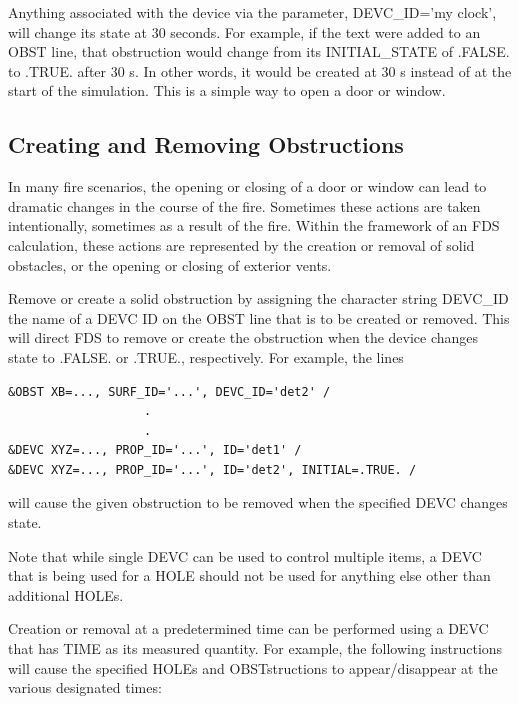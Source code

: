\documentclass[11pt]{book}
\begin{document}
\noindent
Anything associated with the device via the parameter, {\ct DEVC\_ID='my clock'}, will change its state at 30 seconds. For example,
if the text were added to an {\ct OBST} line, that obstruction would change from its {\ct INITIAL\_STATE} of {\ct .FALSE.} to {\ct .TRUE.} after
30 s. In other words, it would be created at 30 s instead of at the start of the simulation. This is a simple way to open a door or window.


\subsection{Creating and Removing Obstructions}
\label{info:create_remove}

In many fire scenarios, the opening or closing of a door or window
can lead to dramatic changes in the course of the fire. Sometimes these
actions are taken intentionally, sometimes as a result of the fire.
Within the framework of an FDS calculation, these actions are
represented by the creation or removal of solid obstacles, or the
opening or closing of exterior vents.

Remove or create a solid obstruction by assigning the character string {\ct DEVC\_ID} the name of
a {\ct DEVC} {\ct ID} on the {\ct OBST} line that is to be created or removed.  This will direct
FDS to remove or create the obstruction when
the device changes state to {\ct .FALSE.} or {\ct .TRUE.}, respectively. For example, the lines

\footnotesize
\begin{verbatim}
&OBST XB=..., SURF_ID='...', DEVC_ID='det2' /
                   .
                   .
&DEVC XYZ=..., PROP_ID='...', ID='det1' /
&DEVC XYZ=..., PROP_ID='...', ID='det2', INITIAL=.TRUE. /
\end{verbatim}
\normalsize

\noindent
will cause the given obstruction to be removed when the specified {\ct DEVC} changes state.

\begin{warning}
\noindent
Note that while single {\ct DEVC} can be used to control multiple items, a {\ct DEVC}
that is being used for a {\ct HOLE} should not be used for anything else other than additional {\ct HOLE}s.
\end{warning}

\noindent
Creation or removal at a predetermined time can be performed using a {\ct DEVC} that has {\ct TIME} as
its measured quantity. For example, the following instructions will cause the specified {\ct HOLE}s and {\ct OBST}structions to
appear/disappear at the various designated times:
\end{document}
